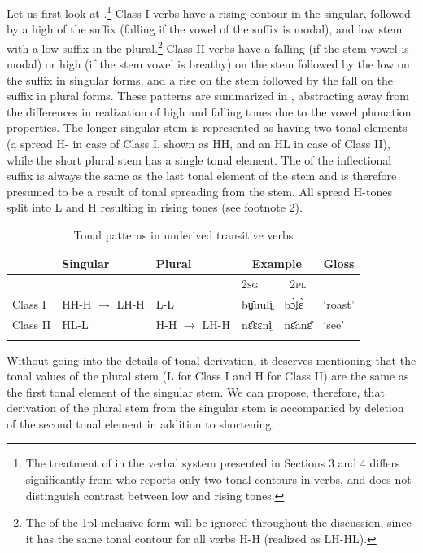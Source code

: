 \documentclass[output=paper,newtxmath,modfonts,nonflat]{langsci/langscibook}
\begin{document}
Let us first look at .\footnote{The treatment of  in the verbal system presented in Sections 3 and 4 differs significantly from \citet{gjersøe2017} who reports only two tonal contours in verbs, and does not distinguish contrast between low and rising tones.} Class I verbs have a rising contour in the singular, followed by a high  of the suffix (falling if the vowel of the suffix is modal), and low stem with a low suffix in the plural.\footnote{The  of the 1pl inclusive form will be ignored throughout the discussion, since it has the same tonal contour for all verbs H-H (realized as LH-HL).} Class II verbs have a falling  (if the stem vowel is modal) or high (if the stem vowel is breathy)  on the stem followed by the low  on the suffix in singular forms, and a rise on the stem followed by the fall on the suffix in plural forms. These patterns are summarized in , abstracting away from the differences in realization of high and falling tones due to the vowel phonation properties. The longer singular stem is represented as having two tonal elements (a spread H- in case of Class I, shown as HH, and an HL in case of Class II), while the short plural stem has a single tonal element. The  of the inflectional suffix is always the same as the last tonal element of the stem and is therefore presumed to be a result of tonal spreading from the stem. All spread H-tones split into L and H resulting in rising tones (see footnote 2). 



\begin{table}
\begin{tabularx}{\textwidth}{lllXXX}
\lsptoprule
 & Singular & Plural & \multicolumn{2}{c}{Example} & Gloss\\
\midrule
&  &  & \scshape 2sg & \multicolumn{1}{c}{\scshape 2pl} & \\
Class I & HH-H $\rightarrow$ LH-H & L-L & bṳ̌uulí̤ & bɔ̤̀lɛ̀ & ‘roast’\\
Class II & HL-L & H-H $\rightarrow$ LH-H & nɛ̂ɛɛnì̤ & nɛ̌anɛ̂ & ‘see’\\
\lspbottomrule
\end{tabularx}
\caption{Tonal patterns in underived transitive verbs}
\label{tab:monich:7}
\end{table}

Without going into the details of tonal derivation, it deserves mentioning that the tonal values of the plural stem (L for Class I and H for Class II) are the same as the first tonal element of the singular stem. We can propose, therefore, that derivation of the plural stem from the singular stem is accompanied by deletion of the second tonal element in addition to shortening.
\end{document}
